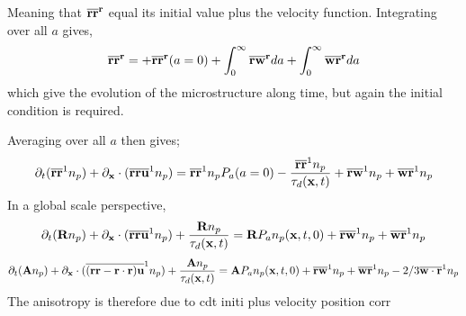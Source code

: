Meaning that $\overline{\textbf{rr}}^{\textbf{r}}$ equal its initial value plus the velocity function. 
Integrating over all $a$ gives,
\begin{equation*}
     \overline{\textbf{rr}}^{\textbf{r}}
    =  
    + \overline{\textbf{rr}}^{\textbf{r}}(a=0)
    + \int_0^\infty \overline{\textbf{rw}}^{\textbf{r}} da
    + \int_0^\infty \overline{\textbf{wr}}^{\textbf{r}} da
\end{equation*}
which give the evolution of the microstructure along time, but again the initial condition is required. 

Averaging over all $a$ then gives;
\begin{equation*}
    \partial_t (\overline{\textbf{rr}}^{1} n_p)
    + \partial_{\textbf{x}} \cdot (\overline{\textbf{rr}\textbf{u} }^{1} n_p)
    =  
    \overline{\textbf{rr}}^{1} n_pP_a(a=0)
    -  \frac{\overline{\textbf{rr}}^{1} n_p}{\tau_d(\textbf{x},t)}
    + \overline{\textbf{rw}}^{1} n_p
    + \overline{\textbf{wr}}^{1} n_p
\end{equation*}
In a global scale perspective, 
\begin{equation*}
    \partial_t (\textbf{R} n_p)
    + \partial_{\textbf{x}} \cdot (\overline{\textbf{rr}\textbf{u} }^{1} n_p)
    +  \frac{\textbf{R} n_p}{\tau_d(\textbf{x},t)}
    =  
    \textbf{R}P_an_p(\textbf{x},t,0) 
    + \overline{\textbf{rw}}^{1} n_p
    + \overline{\textbf{wr}}^{1} n_p
\end{equation*}
\begin{equation*}
    \partial_t (\textbf{A} n_p)
    + \partial_{\textbf{x}} \cdot (\overline{(\textbf{rr}-\textbf{r}\cdot\textbf{r})\textbf{u} }^{1} n_p)
    +  \frac{\textbf{A} n_p}{\tau_d(\textbf{x},t)}
    =  
    \textbf{A}P_an_p(\textbf{x},t,0) 
    + \overline{\textbf{rw}}^{1} n_p
    + \overline{\textbf{wr}}^{1} n_p
    - 2/3 \overline{\textbf{w}\cdot \textbf{r}}^{1} n_p
\end{equation*}
The anisotropy is therefore due to cdt initi plus velocity position corr


